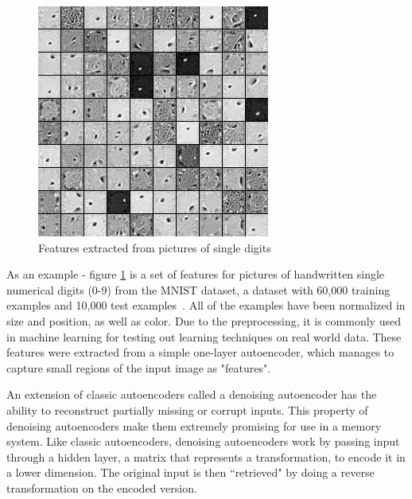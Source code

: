 \documentclass{sig-alternate}
\begin{document}
\begin{figure}[h]
	\begin{center}
		\includegraphics[width=0.75\linewidth]{filters_corruption_30.png}
	\end{center}
	\vspace{-12pt}
	\caption{Features extracted from pictures of single digits}
	\label{fig:features}
\end{figure}

As an example - figure \ref{fig:features} is a set of features for pictures of handwritten single 
numerical digits (0-9) from the MNIST dataset, a dataset with 60,000 training examples
and 10,000 test examples~\cite{denoise}. All of the examples have been normalized in size and position, as well as 
color. Due to the preprocessing, it is commonly used in machine learning for testing out learning 
techniques on real world data.  These features were extracted from a simple one-layer autoencoder, 
which manages to capture small regions of the input image as "features". 

An extension of classic autoencoders called a denoising autoencoder has the ability to reconstruct 
partially missing or corrupt inputs. This property of denoising autoencoders make them extremely 
promising for use in a memory system. Like classic autoencoders, 
denoising autoencoders work by passing input through a hidden 
layer, a matrix that represents a transformation, to encode it in a lower dimension. The original 
input is then ``retrieved" by doing a reverse transformation on the encoded version.~\cite{denoise}
\end{document}

